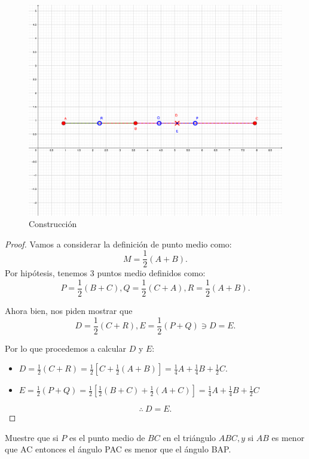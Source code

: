 	\begin{figure}[H]
	\centering
	\includegraphics[scale=1]{Images/P4-1.png}
	\caption{Construcción}
\end{figure}

\begin{proof}
	Vamos a considerar la definición de punto medio como: 
	$$M=\frac{1}{2}(A+B).$$
	Por hipótesis, tenemos 3 puntos medio definidos como:
	$$P=\frac{1}{2}(B+C), Q=\frac{1}{2}(C+A), R=\frac{1}{2}(A+B).$$
	
	Ahora bien, nos piden mostrar que 
	$$D=\frac{1}{2}(C+R), E=\frac{1}{2}(P+Q) \ni D=E.$$
	
	Por lo que procedemos a calcular $D$ y $E$: 
	\begin{itemize}
		\item $D=\frac{1}{2}(C+R)=\frac{1}{2}\left[C+\frac{1}{2}\left(A+B\right)\right]=\frac{1}{4}A+\frac{1}{4}B+\frac{1}{2}C.$
		\item $ E=\frac{1}{2}(P+Q) = \frac{1}{2}\left[\frac{1}{2}(B+C)+\frac{1}{2}(A+C)\right]=\frac{1}{4}A+\frac{1}{4}B+\frac{1}{2}C$
	\end{itemize}
$$\therefore \ D=E.$$
\end{proof}

\begin{problema}
	Muestre que si $P$ es el punto medio de $B C$ en el triángulo $A B C, y$ si $A B$ es menor que AC entonces el ángulo PAC es menor que el ángulo BAP.
\end{problema}

